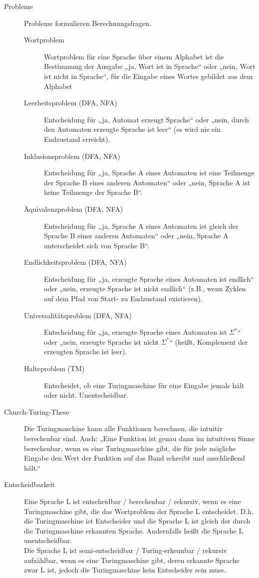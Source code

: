 \begin{description}
    \newpage
    \item[Probleme] Probleme formulieren Berechnungsfragen.
        \begin{description}
            \item[Wortproblem] Wortproblem für eine Sprache über einem Alphabet ist die Bestimmung der Ausgabe „ja, Wort ist in Sprache“ oder „nein, Wort ist nicht in Sprache“, für die Eingabe eines Wortes gebildet aus dem Alphabet 
            \item[Leerheitsproblem (DFA, NFA)] Entscheidung für „ja, Automat erzeugt Sprache“ oder „nein, durch den Automaten erzeugte Sprache ist leer“ (es wird nie ein Endzustand erreicht). 
            \item[Inklusionsproblem (DFA, NFA)] Entscheidung für „ja, Sprache A eines Automaten ist eine Teilmenge der Sprache B eines anderen Automaten“ oder „nein, Sprache A ist keine Teilmenge der Sprache B“. 
            \item[Äquivalenzproblem (DFA, NFA)] Entscheidung für „ja, Sprache A eines Automaten ist gleich der Sprache B eines anderen Automaten“ oder „nein, Sprache A unterscheidet sich von Sprache B“. 
            \item[Endlichkeitsproblem (DFA, NFA)] Entscheidung für „ja, erzeugte Sprache eines Automaten ist endlich“ oder „nein, erzeugte Sprache ist nicht endlich“ (z.B., wenn Zyklen auf dem Pfad von Start- zu Endzustand existieren). 
            \item[Universalitätsproblem (DFA, NFA)] Entscheidung für „ja, erzeugte Sprache eines Automaten ist $\Sigma^*$“ oder „nein, erzeugte Sprache ist nicht $\Sigma^*$“ (heißt, Komplement der erzeugten Sprache ist leer). 
            \item[Halteproblem (TM)] Entscheidet, ob eine Turingmaschine für eine Eingabe jemals hält oder nicht. Unentscheidbar. 
        \end{description}

    \item[Church-Turing-These]
        Die Turingmaschine kann alle Funktionen berechnen, die intuitiv berechenbar sind. Auch: „Eine Funktion ist genau dann
        im intuitiven Sinne berechenbar, wenn es eine Turingmaschine gibt, die für jede mögliche Eingabe den Wert der Funktion auf
        das Band schreibt und anschließend hält.“ 

    \item[Entscheidbarkeit]
        Eine Sprache L ist entscheidbar / berechenbar / rekursiv, wenn es eine Turingmaschine gibt, die das Wortproblem der Sprache L entscheidet.
        D.h. die Turingmaschine ist Entscheider und die Sprache L ist gleich der durch die Turingmaschine erkannten Sprache.
        Andernfalls heißt die Sprache L unentscheidbar. \\
        Die Sprache L ist semi-entscheidbar / Turing-erkennbar / rekursiv aufzählbar, wenn es eine Turingmaschine gibt, deren erkannte Sprache zwar L ist, jedoch die Turingmaschine kein Entscheider sein muss. 


\end{description}
